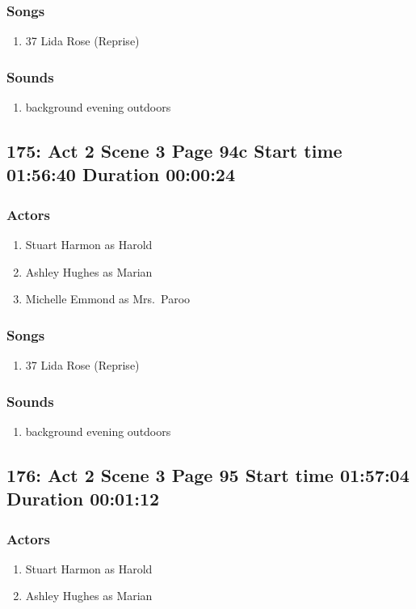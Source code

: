 \subsubsection{Songs}
\begin{enumerate}
\item 37 Lida Rose (Reprise)
\end{enumerate}\subsubsection{Sounds}
\begin{enumerate}
\item background evening outdoors
\end{enumerate}
\subsection{175: Act 2 Scene 3 Page 94c Start time 01:56:40 Duration 00:00:24}

\subsubsection{Actors}
\begin{enumerate}
\item Stuart Harmon as Harold
\item Ashley Hughes as Marian
\item Michelle Emmond as Mrs.~Paroo
\end{enumerate}

\subsubsection{Songs}
\begin{enumerate}
\item 37 Lida Rose (Reprise)
\end{enumerate}\subsubsection{Sounds}
\begin{enumerate}
\item background evening outdoors
\end{enumerate}
\subsection{176: Act 2 Scene 3 Page 95 Start time 01:57:04 Duration 00:01:12}

\subsubsection{Actors}
\begin{enumerate}
\item Stuart Harmon as Harold
\item Ashley Hughes as Marian
\end{enumerate}

